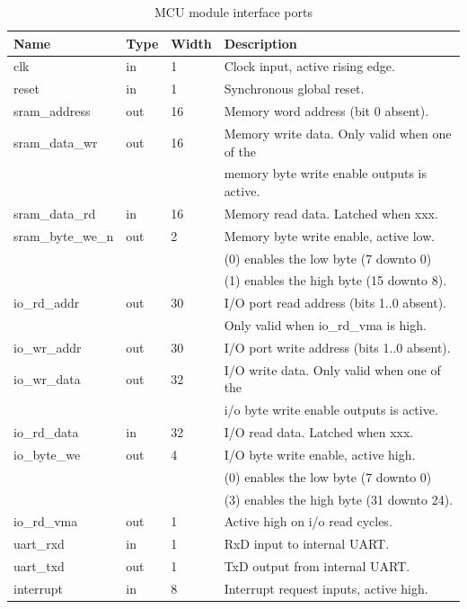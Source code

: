 \begin{table}[h]
\caption{MCU module interface ports}
\begin{tabularx}{\textwidth}{ lll|X }
\toprule
Name & Type & Width & Description \\
\midrule
clk                 & in    & 1  & Clock input, active rising edge. \\
reset               & in    & 1  & Synchronous global reset. \\
\midrule
sram\_address       & out   & 16 & Memory word address (bit 0 absent). \\
sram\_data\_wr      & out   & 16 & Memory write data. Only valid when one of the \\
                    &       &    & memory byte write enable outputs is active.\\
sram\_data\_rd      & in    & 16 & Memory read data. Latched when xxx. \\
sram\_byte\_we\_n   & out   & 2  & Memory byte write enable, active low.  \\
                    &       &    & (0) enables the low byte (7 downto 0) \\
                    &       &    & (1) enables the high byte (15 downto 8). \\
\midrule
io\_rd\_addr        & out   & 30 & I/O port read address (bits 1..0 absent). \\
                    &       &    & Only valid when io\_rd\_vma is high. \\
io\_wr\_addr        & out   & 30 & I/O port write address (bits 1..0 absent). \\
io\_wr\_data        & out   & 32 & I/O write data.  Only valid when one of the \\
                    &       &    & i/o byte write enable outputs is active.\\
io\_rd\_data        & in    & 32 & I/O read data. Latched when xxx. \\
io\_byte\_we        & out   & 4  & I/O byte write enable, active high. \\
                    &       &    & (0) enables the low byte (7 downto 0) \\
                    &       &    & (3) enables the high byte (31 downto 24). \\
io\_rd\_vma         & out   & 1  & Active high on i/o read cycles. \\
\midrule
uart\_rxd           & in    & 1  & RxD input to internal UART. \\
uart\_txd           & out   & 1  & TxD output from internal UART. \\
\midrule
interrupt           & in    & 8  & Interrupt request inputs, active high. \\
\bottomrule
\end{tabularx}
\end{table}

